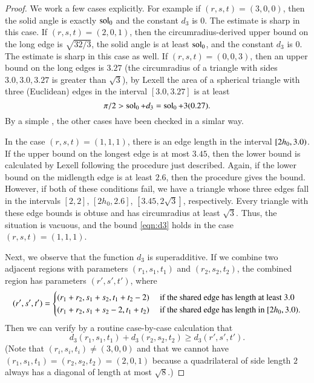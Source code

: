 \documentclass{llncs}
\begin{document}
\begin{proof}
We work a few cases explicitly.
For example if $(r,s,t)=(3,0,0)$, then the solid angle is exactly $\operatorname{sol}_0$ and the constant $d_3$ is $0$.
The estimate is sharp in this case.
If $(r,s,t)=(2,0,1)$, then the circumradius-derived upper bound on the long edge is $\sqrt{32/3}$, the solid angle is at least
$\operatorname{sol}_0$, and the constant $d_3$ is $0$.  The estimate is sharp in this case as well.
If $(r,s,t)=(0,0,3)$, then an upper bound on the long edges is $3.27$ (the circumradius of a triangle
with sides $3.0,3.0,3.27$ is greater than $\sqrt3$), by Lexell the area of a spherical triangle with three (Euclidean) edges
in the interval $[3.0,3.27]$ is at least 
\[
\pi/2 > \operatorname{sol}_0 + d_3 = \operatorname{sol}_0 + 3 (0.27).
\]
By a simple , 
the other cases have been checked in a simlar way.


In the case $(r,s,t)=(1,1,1)$, there is an edge length in the interval $[ 2 h_0,3.0)$.
If the upper bound on the longest edge is at most $3.45$, then the lower bound is calculated by Lexell
following the procedure just described.  Again, if the lower bound on the midlength edge
is at least $2.6$, then the procedure gives the bound.  However, if both of these conditions fail, we
have a triangle whose three edges fall in the intervals $[2,2]$, $[2h_0,2.6]$, $[3.45,2\sqrt3]$,
respectively.  Every
triangle with these edge bounds is obtuse and
has circumradius at least $\sqrt3$.  Thus, the situation is vacuous, and the bound \eqref{eqn:d3}
holds in the case $(r,s,t)=(1,1,1)$.


Next, we observe that the function $d_3$ is superadditive.  If we combine two adjacent regions with parameters
$(r_1,s_1,t_1)$ and $(r_2,s_2,t_2)$, the combined region has parameters $(r',s',t')$, where
\[
(r',s',t') =
\begin{cases} (r_1+r_2,s_1+s_2,t_1+t_2-2) &\text{ if the shared edge has length at least } 3.0\\
(r_1+r_2,s_1+s_2-2,t_1+t_2) &\text{ if the shared edge has length in } [ 2h_0,3.0).
\end{cases}
\]
Then we can verify by a routine case-by-case calculation that
\[
d_3(r_1,s_1,t_1) + d_3(r_2,s_2,t_2) \ge d_3(r',s',t').
\]
(Note that $(r_i,s_i,t_i)\ne (3,0,0)$ and that we cannot have $(r_1,s_1,t_1)=(r_2,s_2,t_2)=(2,0,1)$ because
a quadrilateral of side length $2$ always has a diagonal of length at most $\sqrt8$.)




\end{proof}
\end{document}
